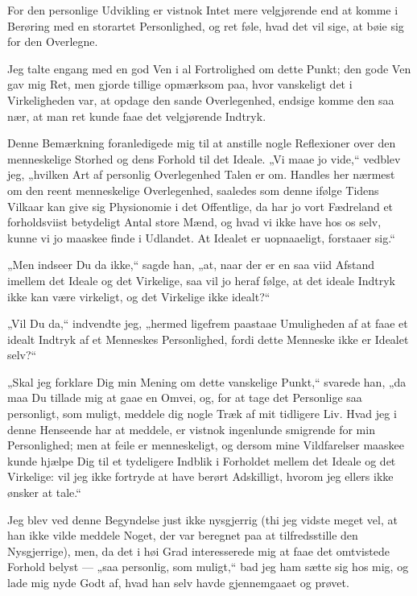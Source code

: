 \documentclass[12pt,a4paper]{book}
\newcommand{\apage}[1]{\marginnote{\footnotesize\textit{[#1]}}}
\begin{document}
For den personlige Udvikling er vistnok Intet mere velgjørende end at
komme i Berøring med en storartet Personlighed, og ret føle, hvad det
vil sige, at bøie sig for den Overlegne.

Jeg talte engang med en god Ven i al Fortrolighed om dette Punkt; den
gode Ven gav mig Ret, men gjorde tillige opmærksom paa, hvor
vanskeligt det i Virkeligheden var, at opdage den sande Overlegenhed,
endsige komme den saa nær, at man ret kunde faae det velgjørende
Indtryk.

Denne Bemærkning foranledigede mig til at anstille nogle Reflexioner
over den menneskelige Storhed og dens Forhold til det Ideale. „Vi
maae jo vide,“ vedblev jeg, „hvilken Art af personlig Overlegenhed
Talen er om. Handles her nærmest om den reent menneskelige
Overlegenhed, saaledes som denne ifølge Tidens Vilkaar kan give sig
Physionomie i det Offentlige, da har jo vort Fædreland et
forholdsviist betydeligt Antal store Mænd, og hvad vi ikke have hos
os selv, kunne vi jo maaskee finde i Udlandet. At Idealet er
uopnaaeligt, forstaaer sig.“

„Men indseer Du da ikke,“ sagde han, „at, naar der er en saa viid
Afstand imellem det Ideale og det Virkelige, saa \apage{56}
vil jo heraf følge, at det ideale Indtryk ikke kan være virkeligt, og
det Virkelige ikke idealt?“

„Vil Du da,“ indvendte jeg, „hermed ligefrem paastaae Umuligheden af
at faae et idealt Indtryk af et Menneskes Personlighed, fordi dette
Menneske ikke er Idealet selv?“

„Skal jeg forklare Dig min Mening om dette vanskelige Punkt,“ svarede
han, „da maa Du tillade mig at gaae en Omvei, og, for at tage det
Personlige saa personligt, som muligt, meddele dig nogle Træk af mit
tidligere Liv. Hvad jeg i denne Henseende har at meddele, er vistnok
ingenlunde smigrende for min Personlighed; men at feile er
menneskeligt, og dersom mine Vildfarelser maaskee kunde hjælpe Dig
til et tydeligere Indblik i Forholdet mellem det Ideale og det
Virkelige: vil jeg ikke fortryde at have berørt Adskilligt, hvorom
jeg ellers ikke ønsker at tale.“

Jeg blev ved denne Begyndelse just ikke nysgjerrig (thi jeg vidste
meget vel, at han ikke vilde meddele Noget, der var beregnet paa at
tilfredsstille den Nysgjerrige), men, da det i høi Grad interesserede
mig at faae det omtvistede Forhold belyst --- „saa personlig, som
muligt,“ bad jeg ham sætte sig hos mig, og lade mig nyde Godt af,
hvad han selv havde gjennemgaaet og prøvet.
\end{document}
